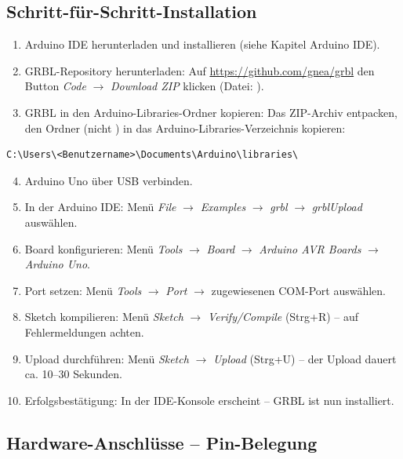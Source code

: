 \subsection{Schritt-für-Schritt-Installation}

\begin{enumerate}
	\item Arduino IDE herunterladen und installieren (siehe Kapitel Arduino IDE).
	\item GRBL-Repository herunterladen: Auf \url{https://github.com/gnea/grbl} den Button \emph{Code} $\rightarrow$ \emph{Download ZIP} klicken (Datei: ).
	\item GRBL in den Arduino-Libraries-Ordner kopieren: Das ZIP-Archiv entpacken, den Ordner  (nicht ) in das Arduino-Libraries-Verzeichnis kopieren:
\end{enumerate}

\begin{lstlisting}[caption={Arduino-Libraries-Verzeichnis},label={lst:grbl_libraries_path}]
	C:\Users\<Benutzername>\Documents\Arduino\libraries\
\end{lstlisting}

\begin{enumerate}
	\setcounter{enumi}{3}
	\item Arduino Uno über USB verbinden.
	\item In der Arduino IDE: Menü \emph{File} $\rightarrow$ \emph{Examples} $\rightarrow$ \emph{grbl} $\rightarrow$ \emph{grblUpload} auswählen.
	\item Board konfigurieren: Menü \emph{Tools} $\rightarrow$ \emph{Board} $\rightarrow$ \emph{Arduino AVR Boards} $\rightarrow$ \emph{Arduino Uno}.
	\item Port setzen: Menü \emph{Tools} $\rightarrow$ \emph{Port} $\rightarrow$ zugewiesenen COM-Port auswählen.
	\item Sketch kompilieren: Menü \emph{Sketch} $\rightarrow$ \emph{Verify/Compile} (Strg+R) -- auf Fehlermeldungen achten.
	\item Upload durchführen: Menü \emph{Sketch} $\rightarrow$ \emph{Upload} (Strg+U) -- der Upload dauert ca. 10--30 Sekunden.
	\item Erfolgsbestätigung: In der IDE-Konsole erscheint \PYTHON{avrdude done. Thank you.} -- GRBL ist nun installiert.
\end{enumerate}

\subsection{Hardware-Anschlüsse -- Pin-Belegung}


